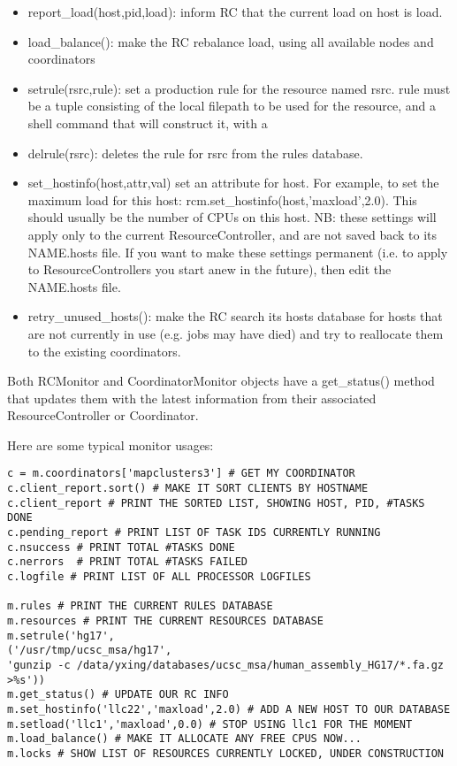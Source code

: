 \documentclass{howto}
\begin{document}
\begin{itemize}

\item
report_load(host,pid,load): inform RC that the current load on host is load.

\item
load_balance(): make the RC rebalance load, using all available nodes and coordinators

\item
setrule(rsrc,rule): set a production rule for the resource named rsrc.  rule must be a tuple consisting of the local filepath to be used for the resource, and a shell command that will construct it, with a %

\item
delrule(rsrc): deletes the rule for rsrc from the rules database.

\item
set_hostinfo(host,attr,val) set an attribute for host.  For example, to set the maximum load for this host: rcm.set_hostinfo(host,'maxload',2.0).  This should usually be the number of CPUs on this host.  NB: these settings will apply only to the current ResourceController, and are not saved back to its NAME.hosts file.  If you want to make these settings permanent (i.e. to apply to ResourceControllers you start anew in the future), then edit the NAME.hosts file.

\item
retry_unused_hosts(): make the RC search its hosts database for hosts that are not currently in use (e.g. jobs may have died) and try to reallocate them to the existing coordinators.

\end{itemize}
Both RCMonitor and CoordinatorMonitor objects have a get_status() method that updates them with the latest information from their associated ResourceController or Coordinator.

Here are some typical monitor usages:

\begin{verbatim}
c = m.coordinators['mapclusters3'] # GET MY COORDINATOR
c.client_report.sort() # MAKE IT SORT CLIENTS BY HOSTNAME
c.client_report # PRINT THE SORTED LIST, SHOWING HOST, PID, #TASKS DONE
c.pending_report # PRINT LIST OF TASK IDS CURRENTLY RUNNING
c.nsuccess # PRINT TOTAL #TASKS DONE
c.nerrors  # PRINT TOTAL #TASKS FAILED
c.logfile # PRINT LIST OF ALL PROCESSOR LOGFILES

m.rules # PRINT THE CURRENT RULES DATABASE
m.resources # PRINT THE CURRENT RESOURCES DATABASE
m.setrule('hg17',
('/usr/tmp/ucsc_msa/hg17',
'gunzip -c /data/yxing/databases/ucsc_msa/human_assembly_HG17/*.fa.gz
>%s'))
m.get_status() # UPDATE OUR RC INFO
m.set_hostinfo('llc22','maxload',2.0) # ADD A NEW HOST TO OUR DATABASE
m.setload('llc1','maxload',0.0) # STOP USING llc1 FOR THE MOMENT
m.load_balance() # MAKE IT ALLOCATE ANY FREE CPUS NOW...
m.locks # SHOW LIST OF RESOURCES CURRENTLY LOCKED, UNDER CONSTRUCTION
\end{verbatim}
\end{document}
